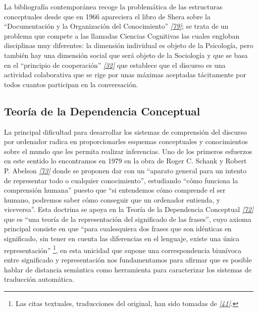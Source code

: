 \documentclass[a4paper,12pt,spanish]{book}
\begin{document}
La bibliografía contemporánea recoge la problemática de las estructuras conceptuales
desde que en 1966 apareciera el libro de Shera sobre la ``Documentación y la Organización
del Conocimiento'' \label{1.state-of-the-art/i.representacion-conocimiento:id2}{\hyperref[zreferences:shera1966]{\emph{{[}79{]}}}}; se trata de un problema que compete a las llamadas
Ciencias Cognitivas las cuales engloban disciplinas muy diferentes: la dimensión individual es
objeto de la Psicología, pero también hay una dimensión social que será objeto de la Sociología
y que se basa en el ``principio de cooperación'' \label{1.state-of-the-art/i.representacion-conocimiento:id3}{\hyperref[zreferences:grice1975]{\emph{{[}32{]}}}} que establece que el discurso
es una actividad colaborativa que se rige por unas máximas aceptadas tácitamente por todos
cuantos participan en la conversación.


\subsection{Teoría de la Dependencia Conceptual}
\label{1.state-of-the-art/i.representacion-conocimiento:teoria-de-la-dependencia-conceptual}\label{1.state-of-the-art/i.representacion-conocimiento:teoria-dependencia-conceptual}
La principal dificultad para desarrollar los sistemas de comprensión del discurso por
ordenador radica en proporcionarles esquemas conceptuales y conocimientos sobre el
mundo que les permita realizar inferencias. Uno de los primeros esfuerzos en este sentido
lo encontramos en 1979 en la obra de Roger C. Schank y Robert P. Abelson \label{1.state-of-the-art/i.representacion-conocimiento:id4}{\hyperref[zreferences:schank1977]{\emph{{[}73{]}}}}
donde se proponen dar con un ``aparato general para un intento de representar todo o cualquier
conocimiento'', estudiando ``cómo funciona la comprensión humana'' puesto que ``si entendemos
cómo comprende el ser humano, podremos saber cómo conseguir que un ordenador entienda,
y viceversa''. Esta doctrina se apoya en la Teoría de la Dependencia Conceptual
\label{1.state-of-the-art/i.representacion-conocimiento:id5}{\hyperref[zreferences:schank1969]{\emph{{[}72{]}}}} que es ``una teoría de la representación del significado de las frases'',
cuyo axioma principal consiste en que ``para cualesquiera dos frases que son idénticas en
significado, sin tener en cuenta las diferencias en el lenguaje, existe una única
representación'' \footnote{
Las citas textuales, traducciones del original, han sido tomadas
de \label{1.state-of-the-art/i.representacion-conocimiento:id8}{\hyperref[zreferences:izquierdoarroyo1995]{\emph{{[}41{]}}}}.
}, en esta unicidad que supone una correspondencia biunívoca entre
significado y representación nos fundamentamos para afirmar que es posible hablar de
distancia semántica como herramienta para caracterizar los sistemas de traducción
automática.
\end{document}
